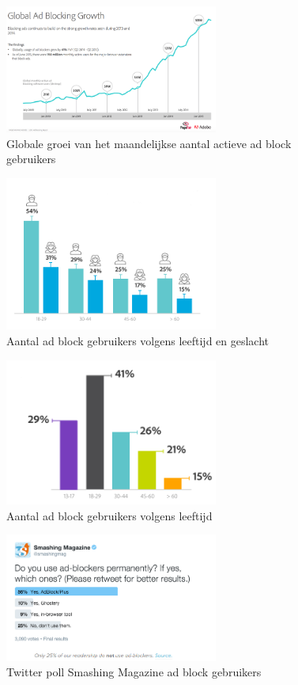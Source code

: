 \documentclass[pdftex,a4paper,12pt,twoside]{report}
\begin{document}
\begin{figure}
\centering
\includegraphics[width=7cm]{img/adblock-growth}
\caption{Globale groei van het maandelijkse aantal actieve ad block gebruikers}
\label{fig: adblock-growth}
\end{figure}
\begin{figure}
\centering
\includegraphics[width=7cm]{img/demographicsMV}
\caption{Aantal ad block gebruikers volgens leeftijd en geslacht}
\label{fig: Demographic_age_sex}
\end{figure}
\begin{figure}
\centering
\includegraphics[width=7cm]{img/demographicsAge}
\caption{Aantal ad block gebruikers volgens leeftijd}
\label{fig: Demographic_age}
\end{figure}
\begin{figure}
\centering
\includegraphics[width=7cm]{img/TwitterPolSmashingMagazine}
\caption{Twitter poll Smashing Magazine ad block gebruikers}
\label{fig: twitter pol Smashing Magazine}
\end{figure}
\end{document}

